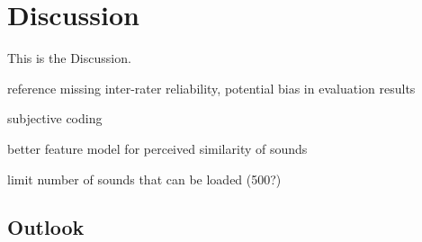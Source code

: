 
\section{Discussion}
\label{sec:discussion}
This is the Discussion.

reference missing inter-rater reliability,
potential bias in evaluation results

subjective coding

better feature model for perceived similarity of sounds

limit number of sounds that can be loaded (500?)



\subsection{Outlook}
\label{subsec:outlook}
